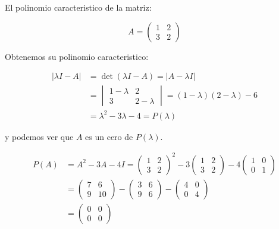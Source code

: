 	\begin{ejemplo}
		El polinomio caracteristico de la matriz:

		\begin{equation*}
			A =
			\begin{pmatrix}
				1 & 2 \\
				3 & 2
			\end{pmatrix}
		\end{equation*}

		Obtenemos su polinomio caracteristico:

		\begin{align*}
			|\lambda I - A| &= \det{(\lambda I - A)} = |A - \lambda I| \\
			&=
			\begin{vmatrix}
				1 - \lambda & 2 \\
				3 & 2 - \lambda
			\end{vmatrix} = (1 - \lambda)(2 - \lambda) - 6 \\
			&= \lambda^2 - 3 \lambda - 4 = P(\lambda)
		\end{align*}

		y podemos ver que $A$ es un cero de $P(\lambda)$.

		\begin{align*}
			P(A) &= A^2 - 3 A - 4I =
			\begin{pmatrix}
				1 & 2 \\
				3 & 2
			\end{pmatrix}^2 - 3
			\begin{pmatrix}
				1 & 2 \\
				3 & 2
			\end{pmatrix} - 4
			\begin{pmatrix}
				1 & 0 \\
				0 & 1
			\end{pmatrix} \\
			&=
			\begin{pmatrix}
				7 & 6 \\
				9 & 10
			\end{pmatrix} -
			\begin{pmatrix}
				3 & 6 \\
				9 & 6
			\end{pmatrix} -
			\begin{pmatrix}
				4 & 0 \\
				0 & 4
			\end{pmatrix} \\
			&=
			\begin{pmatrix}
				0 & 0 \\
				0 & 0
			\end{pmatrix}
		\end{align*}
	\end{ejemplo}

